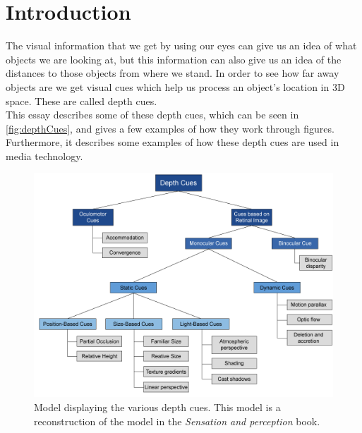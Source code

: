 \section{Introduction}

The visual information that we get by using our eyes can give us an idea of what objects we are looking at, but this information can also give us an idea of the distances to those objects from where we stand. In order to see how far away objects are we get visual cues which help us  process an object's location in 3D space. These are called depth cues\citep[p.~195]{sensationPerception}.\\
This essay describes some of these depth cues, which can be seen in \autoref{fig:depthCues}, and gives a few examples of how they work through figures. Furthermore, it describes some examples of how these depth cues are used in media technology.

\begin{figure}[H]
	\centering
	\includegraphics[width=1\linewidth]{figure/Analysis/depthCues.png}
	\caption{Model displaying the various depth cues. This model is a reconstruction of the model in the \textit{Sensation and perception} book\citep[p.~195]{sensationPerception}.}
	\label{fig:depthCues}
\end{figure}